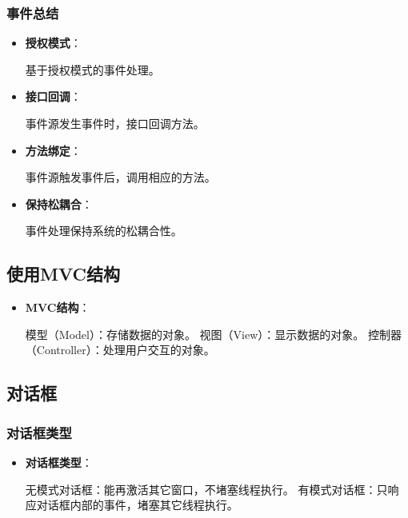 \documentclass[a4paper, 10pt]{ctexart}
\begin{document}
\subsubsection{事件总结}
\begin{itemize}
  \item \textbf{授权模式}：
  \begin{codeblock}
基于授权模式的事件处理。
  \end{codeblock}
  \item \textbf{接口回调}：
  \begin{codeblock}
事件源发生事件时，接口回调方法。
  \end{codeblock}
  \item \textbf{方法绑定}：
  \begin{codeblock}
事件源触发事件后，调用相应的方法。
  \end{codeblock}
  \item \textbf{保持松耦合}：
  \begin{codeblock}
事件处理保持系统的松耦合性。
  \end{codeblock}
\end{itemize}

\subsection{使用MVC结构}
\begin{itemize}
  \item \textbf{MVC结构}：
  \begin{codeblock}
模型（Model）：存储数据的对象。
视图（View）：显示数据的对象。
控制器（Controller）：处理用户交互的对象。
  \end{codeblock}
\end{itemize}

\subsection{对话框}
\subsubsection{对话框类型}
\begin{itemize}
  \item \textbf{对话框类型}：
  \begin{codeblock}
无模式对话框：能再激活其它窗口，不堵塞线程执行。
有模式对话框：只响应对话框内部的事件，堵塞其它线程执行。
  \end{codeblock}
\end{itemize}
\end{document}
